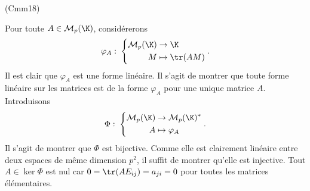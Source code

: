 \begin{tiny}(Cmm18)\end{tiny} Pour toute $A \in \mathcal{M}_p(\K)$, considérerons
\[
\varphi_A : \;
 \left\lbrace 
 \begin{aligned}
  \mathcal{M}_p(\K) &\rightarrow \K \\
  M &\mapsto \tr(AM)
 \end{aligned}
\right. .
\]
Il est clair que $\varphi_A$ est une forme linéaire. Il s'agit de montrer que toute forme linéaire sur les matrices est de la forme $\varphi_A$ pour une unique matrice $A$. Introduisons
\[ \Phi:\;
 \left\lbrace 
 \begin{aligned}
  \mathcal{M}_p(\K) &\rightarrow \mathcal{M}_p(\K)^{*} \\
  A &\mapsto \varphi_A
 \end{aligned}
\right. .
\]
Il s'agit de montrer que $\Phi$ est bijective. Comme elle est clairement linéaire entre deux espaces de même dimension $p^2$, il suffit de montrer qu'elle est injective.\newline
Tout $A \in \ker \Phi$ est nul car $0 = \tr(AE_{i j}) = a_{j i } = 0$ pour toutes les matrices élémentaires.
